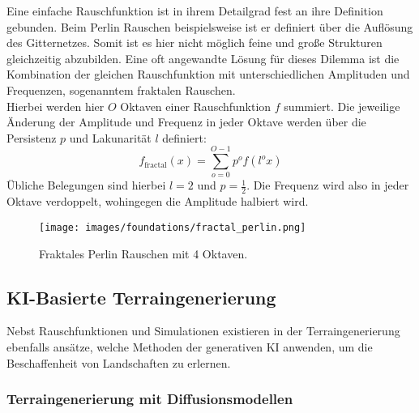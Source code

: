 Eine einfache Rauschfunktion ist in ihrem Detailgrad fest an ihre Definition gebunden. Beim Perlin Rauschen beispielsweise ist er definiert über die Auflösung des Gitternetzes. Somit ist es hier nicht möglich feine und große Strukturen gleichzeitig abzubilden. Eine oft angewandte Lösung für dieses Dilemma ist die Kombination der gleichen Rauschfunktion mit unterschiedlichen Amplituden und Frequenzen, sogenanntem fraktalen Rauschen. \\
Hierbei werden hier $O$ Oktaven einer Rauschfunktion $f$ summiert. Die jeweilige Änderung der Amplitude und Frequenz in jeder Oktave werden über die Persistenz $p$ und Lakunarität $l$ definiert:  
\begin{equation}
    f_\text{fractal}(x) = \sum_{o=0}^{O-1} p^{o}f(l^ox)
\end{equation}
Übliche Belegungen sind hierbei $l=2$ und $p=\frac{1}{2}$. Die Frequenz wird also in jeder Oktave verdoppelt, wohingegen die Amplitude halbiert wird.

\begin{figure}[ht]
    \centering
    \texttt{[image: images/foundations/fractal\_perlin.png]} 
    \caption{Fraktales Perlin Rauschen mit 4 Oktaven.}
    \label{fig:fractal_perlin}
\end{figure}

\subsection{KI-Basierte Terraingenerierung}

Nebst Rauschfunktionen und Simulationen existieren in der Terraingenerierung ebenfalls ansätze, welche Methoden der generativen KI anwenden, um die Beschaffenheit von Landschaften zu erlernen.




\subsubsection{Terraingenerierung mit Diffusionsmodellen}

